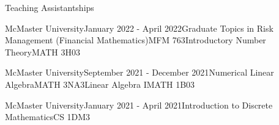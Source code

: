 \begin{rSection}{Teaching Assistantships}

\begin{taSubsectionFull}{McMaster University}{January 2022 - April 2022}{Graduate Topics in Risk Management (Financial Mathematics)}{MFM 763}{Introductory Number Theory}{MATH 3H03}
\end{taSubsectionFull}

\begin{taSubsectionFull}{McMaster University}{September 2021 - December 2021}{Numerical Linear Algebra}{MATH 3NA3}{Linear Algebra I}{MATH 1B03}
\end{taSubsectionFull}

\begin{taSubsectionMin}{McMaster University}{January 2021 - April 2021}{Introduction to Discrete Mathematics}{CS 1DM3}
\end{taSubsectionMin}

\end{rSection}